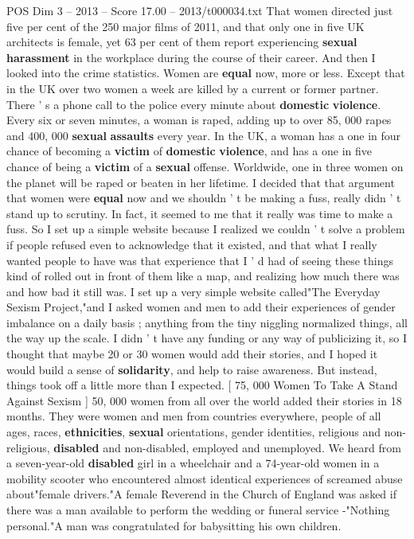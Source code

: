 \begin{textsample}{POS Dim 3 – 2013 – Score 17.00 – 2013/t000034.txt}
That women directed just five per cent of the 250 major films of 2011, and that only one in five UK architects is female, yet 63 per cent of them report experiencing \textbf{sexual} \textbf{harassment} in the workplace during the course of their career.
And then I looked into the crime statistics.
Women are \textbf{equal} now, more or less.
Except that in the UK over two women a week are killed by a current or former partner.
There ' s a phone call to the police every minute about \textbf{domestic} \textbf{violence}.
Every six or seven minutes, a woman is raped, adding up to over 85, 000 rapes and 400, 000 \textbf{sexual} \textbf{assaults} every year.
In the UK, a woman has a one in four chance of becoming a \textbf{victim} of \textbf{domestic} \textbf{violence}, and has a one in five chance of being a \textbf{victim} of a \textbf{sexual} offense.
Worldwide, one in three women on the planet will be raped or beaten in her lifetime.
I decided that that argument that women were \textbf{equal} now and we shouldn ' t be making a fuss, really didn ' t stand up to scrutiny.
In fact, it seemed to me that it really was time to make a fuss.
So I set up a simple website because I realized we couldn ' t solve a problem if people refused even to acknowledge that it existed, and that what I really wanted people to have was that experience that I ' d had of seeing these things kind of rolled out in front of them like a map, and realizing how much there was and how bad it still was.
I set up a very simple website called"The Everyday Sexism Project,"and I asked women and men to add their experiences of gender imbalance on a daily basis ; anything from the tiny niggling normalized things, all the way up the scale.
I didn ' t have any funding or any way of publicizing it, so I thought that maybe 20 or 30 women would add their stories, and I hoped it would build a sense of \textbf{solidarity}, and help to raise awareness.
But instead, things took off a little more than I expected. [ 75, 000 Women To Take A Stand Against Sexism ] 50, 000 women from all over the world added their stories in 18 months.
They were women and men from countries everywhere, people of all ages, races, \textbf{ethnicities}, \textbf{sexual} orientations, gender identities, religious and non-religious, \textbf{disabled} and non-disabled, employed and unemployed.
We heard from a seven-year-old \textbf{disabled} girl in a wheelchair and a 74-year-old women in a mobility scooter who encountered almost identical experiences of screamed abuse about"female drivers."A female Reverend in the Church of England was asked if there was a man available to perform the wedding or funeral service -"Nothing personal."A man was congratulated for babysitting his own children.

\end{textsample}
